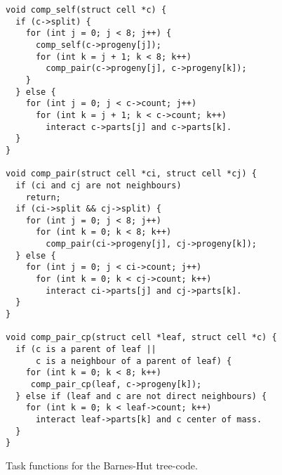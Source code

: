 \documentclass[fleqn,10pt]{wlpeerj}
\begin{document}
\begin{figure}
\begin{center}\begin{minipage}{0.9\textwidth}
    \begin{lstlisting}[basicstyle=\scriptsize\tt]
void comp_self(struct cell *c) {
  if (c->split) {
    for (int j = 0; j < 8; j++) {
      comp_self(c->progeny[j]);
      for (int k = j + 1; k < 8; k++)
        comp_pair(c->progeny[j], c->progeny[k]);
    }
  } else {
    for (int j = 0; j < c->count; j++)
      for (int k = j + 1; k < c->count; k++)
        interact c->parts[j] and c->parts[k].
  }
}

void comp_pair(struct cell *ci, struct cell *cj) {
  if (ci and cj are not neighbours)
    return;
  if (ci->split && cj->split) {
    for (int j = 0; j < 8; j++)
      for (int k = 0; k < 8; k++)
        comp_pair(ci->progeny[j], cj->progeny[k]);
  } else {
    for (int j = 0; j < ci->count; j++)
      for (int k = 0; k < cj->count; k++)
        interact ci->parts[j] and cj->parts[k].
  }
}

void comp_pair_cp(struct cell *leaf, struct cell *c) {
  if (c is a parent of leaf ||
      c is a neighbour of a parent of leaf) {
    for (int k = 0; k < 8; k++)
     comp_pair_cp(leaf, c->progeny[k]);
  } else if (leaf and c are not direct neighbours) {
    for (int k = 0; k < leaf->count; k++)
      interact leaf->parts[k] and c center of mass.
  }
}
    \end{lstlisting}
\end{minipage}\end{center}
    \caption{Task functions for the Barnes-Hut tree-code.}
    \label{fig:BHTasks}
\end{figure}
\end{document}

